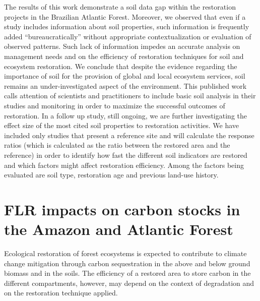 The results of this work demonstrate a soil data gap within the restoration projects in the Brazilian Atlantic Forest. Moreover, we observed that even if a study includes information about soil properties, such information is frequently added “bureaucratically” without appropriate contextualization or evaluation of observed patterns. Such lack of information impedes an accurate analysis on management needs and on the efficiency of restoration techniques for soil and ecosystem restoration. We conclude that despite the evidence regarding the importance of soil for the provision of global and local ecosystem services, soil remains an under-investigated aspect of the environment. This published work calls attention of scientists and practitioners to include basic soil analysis in their studies and monitoring in order to maximize the successful outcomes of restoration. In a follow up study, still ongoing, we are further investigating the effect size of the most cited soil properties to restoration activities. We have included only studies that present a reference site and will calculate the response ratios (which is calculated as the ratio between the restored area and the reference) in order to identify how fast the different soil indicators are restored and which factors might affect restoration efficiency. Among the factors being evaluated are soil type, restoration age and previous land-use history.  



\section{\Large FLR impacts on carbon stocks in the Amazon and Atlantic Forest}  \label{sec:car-soil}

Ecological restoration of forest ecosystems is expected to contribute to climate change mitigation through carbon sequestration in the above and below ground biomass and in the soils. The efficiency of a restored area to store carbon in the different compartments, however, may depend on the context of degradation and on the restoration technique applied. 

